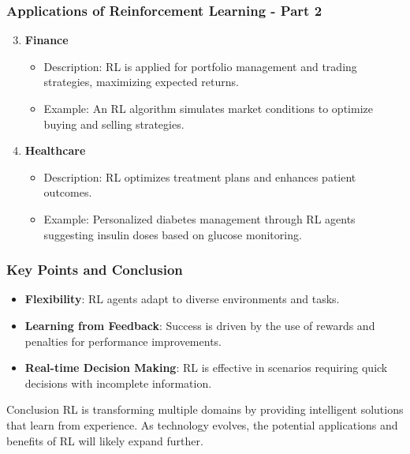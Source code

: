 \documentclass{beamer}
\begin{document}
\begin{frame}
    \frametitle{Applications of Reinforcement Learning - Part 2}
    \begin{enumerate}
        \setcounter{enumi}{2} %
        \item \textbf{Finance}
            \begin{itemize}
                \item Description: RL is applied for portfolio management and trading strategies, maximizing expected returns.
                \item Example: An RL algorithm simulates market conditions to optimize buying and selling strategies.
            \end{itemize}
        
        \item \textbf{Healthcare}
            \begin{itemize}
                \item Description: RL optimizes treatment plans and enhances patient outcomes.
                \item Example: Personalized diabetes management through RL agents suggesting insulin doses based on glucose monitoring.
            \end{itemize}
    \end{enumerate}
\end{frame}

\begin{frame}
    \frametitle{Key Points and Conclusion}
    \begin{itemize}
        \item \textbf{Flexibility}: RL agents adapt to diverse environments and tasks.
        \item \textbf{Learning from Feedback}: Success is driven by the use of rewards and penalties for performance improvements.
        \item \textbf{Real-time Decision Making}: RL is effective in scenarios requiring quick decisions with incomplete information.
    \end{itemize}
    
    \begin{block}{Conclusion}
        RL is transforming multiple domains by providing intelligent solutions that learn from experience. As technology evolves, the potential applications and benefits of RL will likely expand further.
    \end{block}
\end{frame}
\end{document}
